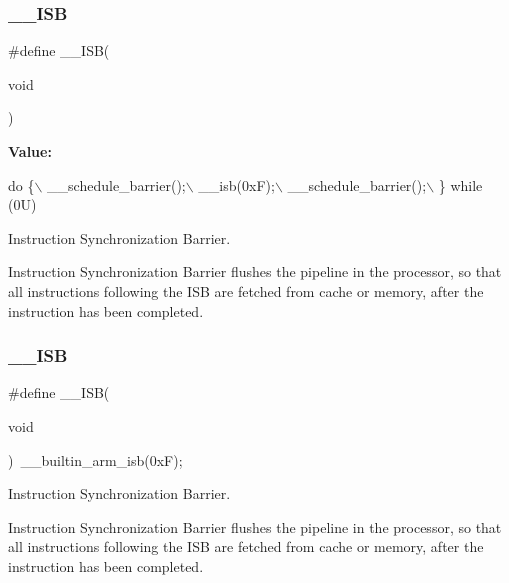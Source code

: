 \subsubsection{\texorpdfstring{\+\_\+\+\_\+\+I\+SB}{\_\_ISB}\hspace{0.1cm}{\footnotesize\ttfamily [1/2]}}
{\footnotesize\ttfamily \#define \+\_\+\+\_\+\+I\+SB(\begin{DoxyParamCaption}\item[{}]{void }\end{DoxyParamCaption})}

{\bfseries Value\+:}
\begin{DoxyCode}
\textcolor{keywordflow}{do} \{\(\backslash\)
                   \_\_schedule\_barrier();\(\backslash\)
                   \_\_isb(0xF);\(\backslash\)
                   \_\_schedule\_barrier();\(\backslash\)
                \} \textcolor{keywordflow}{while} (0U)
\end{DoxyCode}


Instruction Synchronization Barrier. 

Instruction Synchronization Barrier flushes the pipeline in the processor, so that all instructions following the I\+SB are fetched from cache or memory, after the instruction has been completed. \mbox{\label{group___c_m_s_i_s___core___instruction_interface_gaad233022e850a009fc6f7602be1182f6}} 
\subsubsection{\texorpdfstring{\+\_\+\+\_\+\+I\+SB}{\_\_ISB}\hspace{0.1cm}{\footnotesize\ttfamily [2/2]}}
{\footnotesize\ttfamily \#define \+\_\+\+\_\+\+I\+SB(\begin{DoxyParamCaption}\item[{}]{void }\end{DoxyParamCaption})~\+\_\+\+\_\+builtin\+\_\+arm\+\_\+isb(0x\+F);}



Instruction Synchronization Barrier. 

Instruction Synchronization Barrier flushes the pipeline in the processor, so that all instructions following the I\+SB are fetched from cache or memory, after the instruction has been completed. \mbox{\label{group___c_m_s_i_s___core___instruction_interface_gabd585ddc865fb9b7f2493af1eee1a572}} 
